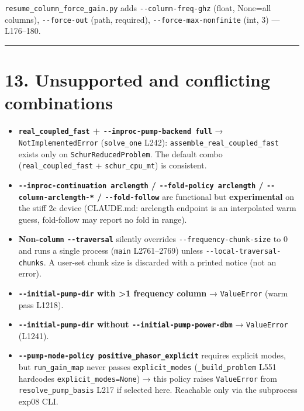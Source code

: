 \documentclass[
  10pt,
]{article}
\providecommand{\tightlist}{%
  \setlength{\itemsep}{0pt}\setlength{\parskip}{0pt}}
\begin{document}
\texttt{resume\_column\_force\_gain.py} adds
\texttt{-\/-column-freq-ghz} (float, None=all columns),
\texttt{-\/-force-out} (path, required),
\texttt{-\/-force-max-nonfinite} (int, 3) --- L176--180.

\begin{center}\rule{0.5\linewidth}{0.5pt}\end{center}

\section{13. Unsupported and conflicting
combinations}\label{unsupported-and-conflicting-combinations}

\begin{itemize}
\tightlist
\item
  \textbf{\texttt{real\_coupled\_fast} +
  \texttt{-\/-inproc-pump-backend\ full}} → \texttt{NotImplementedError}
  (\texttt{solve\_one} L242): \texttt{assemble\_real\_coupled\_fast}
  exists only on \texttt{SchurReducedProblem}. The default combo
  (\texttt{real\_coupled\_fast} + \texttt{schur\_cpu\_mt}) is
  consistent.
\item
  \textbf{\texttt{-\/-inproc-continuation\ arclength} /
  \texttt{-\/-fold-policy\ arclength} / \texttt{-\/-column-arclength-*}
  / \texttt{-\/-fold-follow}} are functional but \textbf{experimental}
  on the stiff 2c device (CLAUDE.md: arclength endpoint is an
  interpolated warm guess, fold-follow may report no fold in range).
\item
  \textbf{Non-\texttt{column} \texttt{-\/-traversal}} silently overrides
  \texttt{-\/-frequency-chunk-size} to 0 and runs a single process
  (\texttt{main} L2761--2769) unless
  \texttt{-\/-local-traversal-chunks}. A user-set chunk size is
  discarded with a printed notice (not an error).
\item
  \textbf{\texttt{-\/-initial-pump-dir} with \textgreater1 frequency
  column} → \texttt{ValueError} (warm pass L1218).
\item
  \textbf{\texttt{-\/-initial-pump-dir} without
  \texttt{-\/-initial-pump-power-dbm}} → \texttt{ValueError} (L1241).
\item
  \textbf{\texttt{-\/-pump-mode-policy\ positive\_phasor\_explicit}}
  requires explicit modes, but \texttt{run\_gain\_map} never passes
  \texttt{explicit\_modes} (\texttt{\_build\_problem} L551 hardcodes
  \texttt{explicit\_modes=None}) → this policy raises
  \texttt{ValueError} from \texttt{resolve\_pump\_basis} L217 if
  selected here. Reachable only via the subprocess exp08 CLI.

\end{itemize}
\end{document}
